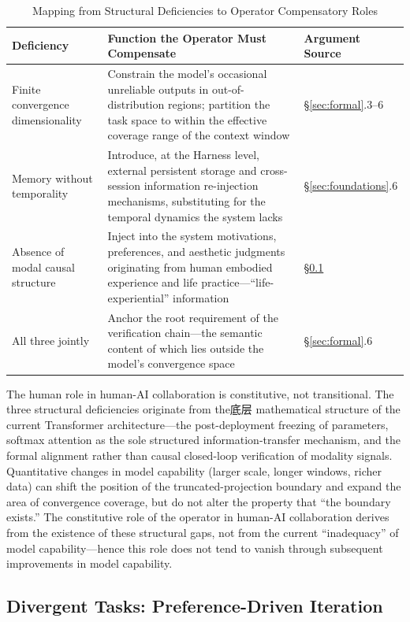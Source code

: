 \documentclass[11pt,a4paper]{article}
\theoremstyle{definition}
\begin{document}
\begin{table}[H]
\centering
\caption{Mapping from Structural Deficiencies to Operator Compensatory Roles}
\begin{tabular}{@{}p{2.5cm}p{5.5cm}p{5cm}@{}}
\toprule
\textbf{Deficiency} & \textbf{Function the Operator Must Compensate} & \textbf{Argument Source} \\
\midrule
Finite convergence dimensionality & Constrain the model's occasional unreliable outputs in out-of-distribution regions; partition the task space to within the effective coverage range of the context window & \S\ref{sec:formal}.3--6 \\
Memory without temporality & Introduce, at the Harness level, external persistent storage and cross-session information re-injection mechanisms, substituting for the temporal dynamics the system lacks & \S\ref{sec:foundations}.6 \\
Absence of modal causal structure & Inject into the system motivations, preferences, and aesthetic judgments originating from human embodied experience and life practice---``life-experiential'' information & \S\ref{sec:divergent_formal} \\
All three jointly & Anchor the root requirement of the verification chain---the semantic content of which lies outside the model's convergence space & \S\ref{sec:formal}.6 \\
\bottomrule
\end{tabular}
\end{table}

The human role in human-AI collaboration is constitutive, not transitional. The three structural deficiencies originate from the底层 mathematical structure of the current Transformer architecture---the post-deployment freezing of parameters, softmax attention as the sole structured information-transfer mechanism, and the formal alignment rather than causal closed-loop verification of modality signals. Quantitative changes in model capability (larger scale, longer windows, richer data) can shift the position of the truncated-projection boundary and expand the area of convergence coverage, but do not alter the property that ``the boundary exists.'' The constitutive role of the operator in human-AI collaboration derives from the existence of these structural gaps, not from the current ``inadequacy'' of model capability---hence this role does not tend to vanish through subsequent improvements in model capability.

\subsection{Divergent Tasks: Preference-Driven Iteration}
\label{sec:divergent_formal}
\end{document}
